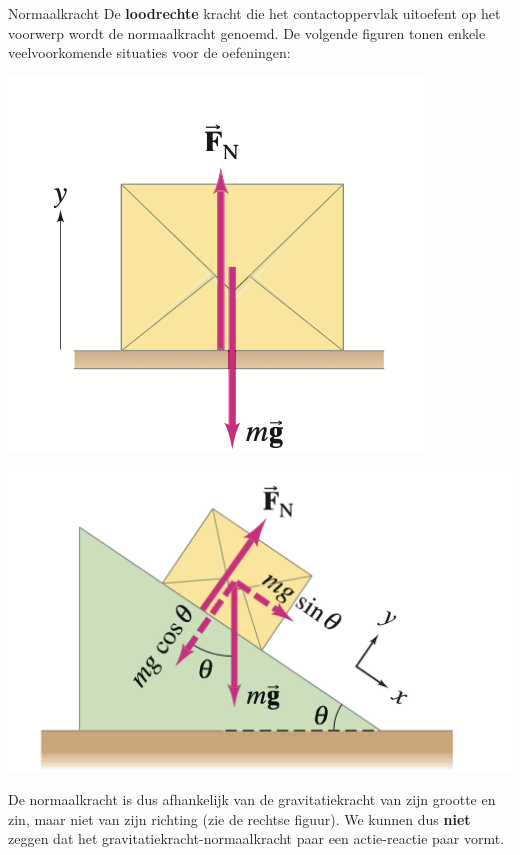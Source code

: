 \begin{theo}[Normaalkracht]{Normaalkracht}
    De \textbf{loodrechte} kracht die het contactoppervlak uitoefent op het voorwerp wordt de normaalkracht genoemd. De volgende figuren tonen enkele veelvoorkomende situaties voor de oefeningen:
    
    \begin{minipage}{.48\textwidth}
        \begin{center}
            \includegraphics[scale = 0.7]{Images/Dynamica/Doos in rust.png}   
        \end{center}
    \end{minipage} 
    \begin{minipage}{.48\textwidth}
        \begin{center}
            \includegraphics[scale = 0.35]{Images/Dynamica/Glijdende doos.png}
        \end{center}
    \end{minipage}
    
    \vspace{0.25cm}
    
    \noindent De normaalkracht is dus afhankelijk van de gravitatiekracht van zijn grootte en zin, maar niet van zijn richting (zie de rechtse figuur). We kunnen dus \textbf{niet} zeggen dat het gravitatiekracht-normaalkracht paar een actie-reactie paar vormt. 
\end{theo}


